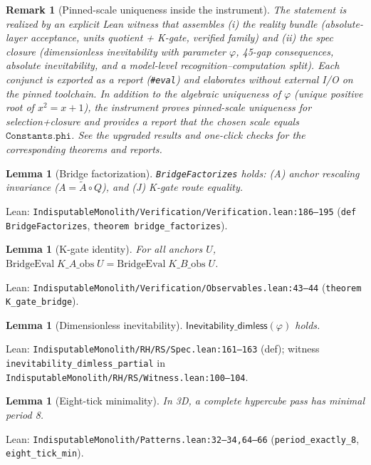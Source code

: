 \documentclass[11pt,a4paper,twoside]{article}
\numberwithin{equation}{section}
\theoremstyle{customthm}
\newtheorem{lemma}[theorem]{Lemma}
\theoremstyle{customdef}
\theoremstyle{customrem}
\newtheorem{remark}[theorem]{Remark}
\begin{document}
\begin{remark}[Pinned-scale uniqueness inside the instrument]
The statement is realized by an explicit Lean witness that assembles (i) the reality bundle (absolute-layer acceptance, units quotient + K-gate, verified family) and (ii) the spec closure (dimensionless inevitability with parameter $\varphi$, 45-gap consequences, absolute inevitability, and a model-level recognition–computation split). Each conjunct is exported as a report (\texttt{\#eval}) and elaborates without external I/O on the pinned toolchain. In addition to the algebraic uniqueness of $\varphi$ (unique positive root of $x^2=x+1$), the instrument proves pinned-scale uniqueness for selection+closure and provides a report that the chosen scale equals $\texttt{Constants.phi}$. See the upgraded results and one-click checks for the corresponding theorems and reports.
\end{remark}

\begin{lemma}[Bridge factorization]\label{lem:factorizes}
\texttt{BridgeFactorizes} holds: (A) anchor rescaling invariance (\(A=\tilde A\circ Q\)), and (J) K-gate route equality.
\end{lemma}
\noindent Lean: \texttt{IndisputableMonolith/Verification/Verification.lean:186--195} (\texttt{def BridgeFactorizes}, \texttt{theorem bridge\_factorizes}).

\begin{lemma}[K-gate identity]\label{lem:kgate}
For all anchors $U$, \(\mathrm{BridgeEval}\;K\_A\_\mathrm{obs}\;U = \mathrm{BridgeEval}\;K\_B\_\mathrm{obs}\;U\).
\end{lemma}
\noindent Lean: \texttt{IndisputableMonolith/Verification/Observables.lean:43--44} (\texttt{theorem K\_gate\_bridge}).

\begin{lemma}[Dimensionless inevitability]\label{lem:inevitability}
\(\mathsf{Inevitability\_dimless}(\varphi)\) holds.
\end{lemma}
\noindent Lean: \texttt{IndisputableMonolith/RH/RS/Spec.lean:161--163} (def); witness \texttt{inevitability\_dimless\_partial} in \texttt{IndisputableMonolith/RH/RS/Witness.lean:100--104}.

\begin{lemma}[Eight-tick minimality]\label{lem:eight}
In 3D, a complete hypercube pass has minimal period 8.
\end{lemma}
\noindent Lean: \texttt{IndisputableMonolith/Patterns.lean:32--34,64--66} (\texttt{period\_exactly\_8}, \texttt{eight\_tick\_min}).
\end{document}
